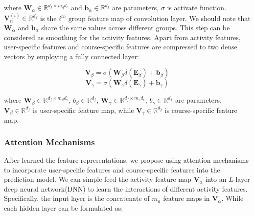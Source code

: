 \noindent where $\mathbf{W}_{\alpha} \in \mathbb{R}^{d_f \times m_gd_e} $ and $\mathbf{b}_{\alpha} \in \mathbb{R}^{d_f}$ are parameters, $\sigma$ is activate function. $\mathbf{V}^{(i)}_\alpha \in \mathbb{R}^{d_f}$ is the $i^{th}$ group feature map of convolution layer. We should note that $\mathbf{W}_{\alpha}$ and $\mathbf{b}_\alpha$ share the same values across different groups. 
This step can be considered as smoothing for the activity features. 
Apart from activity features, user-specific features and course-specific features are compressed to two dense vectors by employing a fully connected layer:

\begin{equation}
\mathbf{V}_\beta = \sigma(\mathbf{W}_\beta \delta(\mathbf{E}_\beta) +\mathbf{b}_\beta)
\end{equation}
\begin{equation}
\mathbf{V}_\gamma = \sigma(\mathbf{W}_\gamma \delta(\mathbf{E}_\gamma) +\mathbf{b}_\gamma)
\end{equation}

\noindent where $\mathbf{W}_\beta \in \mathbb{R}^{d_f\times m_\beta d_e}$, $b_\beta \in \mathbb{R}^{d_f}$, $\mathbf{W}_\gamma \in \mathbb{R}^{d_f\times m_\gamma d_e}$, $b_\gamma \in \mathbb{R}^{d_f}$  are parameters. 
$\mathbf{V}_\beta \in \mathbb{R}^{d_f}$ is user-specific feature map, while $\mathbf{V}_\gamma \in \mathbb{R}^{d_f}$ is course-specific feature map.

\subsubsection{Attention Mechanisms}
After learned the feature representations, we propose using attention mechanisms to incorporate user-specific features and course-specific features into the prediction model.
We can simple feed the activity feature map $\mathbf{V}_\alpha$ into an $L$-layer deep neural network(DNN) to learn the interactions of different activity features. Specifically, the input layer is the concatenate of $m_a$ feature maps in $\mathbf{V}_\alpha$. While each hidden layer can be formulated as:

